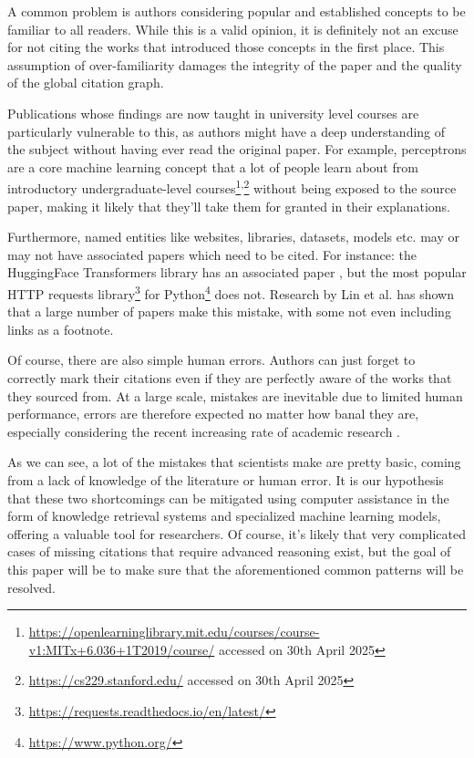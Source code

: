 \documentclass[12pt,a4paper]{report}
\begin{document}
A common problem is authors considering popular and established concepts to be familiar to all readers. While this is a valid opinion, it is definitely not an excuse for not citing the works that introduced those concepts in the first place. This assumption of over-familiarity damages the integrity of the paper and the quality of the global citation graph.

Publications whose findings are now taught in university level courses are particularly vulnerable to this, as authors might have a deep understanding of the subject without having ever read the original paper. For example, perceptrons \cite{Rosenblatt1958ThePA} are a core machine learning concept that a lot of people learn about from introductory undergraduate-level courses\footnote{\url{https://openlearninglibrary.mit.edu/courses/course-v1:MITx+6.036+1T2019/course/} accessed on 30th April 2025}\textsuperscript{,}\footnote{\url{https://cs229.stanford.edu/} accessed on 30th April 2025} without being exposed to the source paper, making it likely that they'll take them for granted in their explanations.

Furthermore, named entities like websites, libraries, datasets, models etc. may or may not have associated papers which need to be cited. For instance: the HuggingFace Transformers library has an associated paper \cite{Wolf2019HuggingFacesTS}, but the most popular HTTP requests library\footnote{\url{https://requests.readthedocs.io/en/latest/}} for Python\footnote{\url{https://www.python.org/}} does not. Research by Lin et al. \cite{Lin2022DetectingAA} has shown that a large number of papers make this mistake, with some not even including links as a footnote. 

Of course, there are also simple human errors. Authors can just forget to correctly mark their citations even if they are perfectly aware of the works that they sourced from. At a large scale, mistakes are inevitable \cite{Reason2000HumanEM} due to limited human performance, errors are therefore expected no matter how banal they are, especially considering the recent increasing rate of academic research \cite{increasing-yearly-publications}.

As we can see, a lot of the mistakes that scientists make are pretty basic, coming from a lack of knowledge of the literature or human error. It is our hypothesis that these two shortcomings can be mitigated using computer assistance in the form of knowledge retrieval systems \cite{Lewis2020RetrievalAugmentedGF} and specialized machine learning models, offering a valuable tool for researchers. Of course, it's likely that very complicated cases of missing citations that require advanced reasoning exist, but the goal of this paper will be to make sure that the aforementioned common patterns will be resolved.
\end{document}
